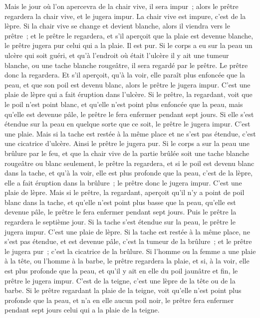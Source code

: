 \begin{multicols}{2}
Mais le jour où l'on apercevra de la chair vive, il sera impur~;
alors le prêtre regardera la chair vive, et le jugera impur. La chair vive est impure, c'est de la lèpre.
Si la chair vive se change et devient blanche, alors il viendra vers le prêtre~;
et le prêtre le regardera, et s'il aperçoit que la plaie est devenue blanche, le prêtre jugera pur celui qui a la plaie. Il est pur.
Si le corps a eu sur la peau un ulcère qui soit guéri,
et qu'à l'endroit où était l'ulcère il y ait une tumeur blanche, ou une tache blanche rougeâtre, il sera regardé par le prêtre.
Le prêtre donc la regardera. Et s'il aperçoit, qu'à la voir, elle paraît plus enfoncée que la peau, et que son poil est devenu blanc, alors le prêtre le jugera impur. C'est une plaie de lèpre qui a fait éruption dans l'ulcère.
Si le prêtre, la regardant, voit que le poil n'est point blanc, et qu'elle n'est point plus enfoncée que la peau, mais qu'elle est devenue pâle, le prêtre le fera enfermer pendant sept jours.
Si elle s'est étendue sur la peau en quelque sorte que ce soit, le prêtre le jugera impur. C'est une plaie.
Mais si la tache est restée à la même place et ne s'est pas étendue, c'est une cicatrice d'ulcère. Ainsi le prêtre le jugera pur.
Si le corps a sur la peau une brûlure par le feu, et que la chair vive de la partie brûlée soit une tache blanche rougeâtre ou blanc seulement, le prêtre la regardera,
et si le poil est devenu blanc dans la tache, et qu'à la voir, elle est plus profonde que la peau, c'est de la lèpre, elle a fait éruption dans la brûlure~; le prêtre donc le jugera impur. C'est une plaie de lèpre.
Mais si le prêtre, la regardant, aperçoit qu'il n'y a point de poil blanc dans la tache, et qu'elle n'est point plus basse que la peau, qu'elle est devenue pâle, le prêtre le fera enfermer pendant sept jours.
Puis le prêtre la regardera le septième jour. Si la tache s'est étendue sur la peau, le prêtre le jugera impur. C'est une plaie de lèpre.
Si la tache est restée à la même place, ne s'est pas étendue, et est devenue pâle, c'est la tumeur de la brûlure~; et le prêtre le jugera pur~; c'est la cicatrice de la brûlure.
Si l'homme ou la femme a une plaie à la tête, ou l'homme à la barbe,
le prêtre regardera la plaie, et si, à la voir, elle est plus profonde que la peau, et qu'il y ait en elle du poil jaunâtre et fin, le prêtre le jugera impur. C'est de la teigne, c'est une lèpre de la tête ou de la barbe.
Si le prêtre regardant la plaie de la teigne, voit qu'elle n'est point plus profonde que la peau, et n'a en elle aucun poil noir, le prêtre fera enfermer pendant sept jours celui qui a la plaie de la teigne.

\end{multicols}
